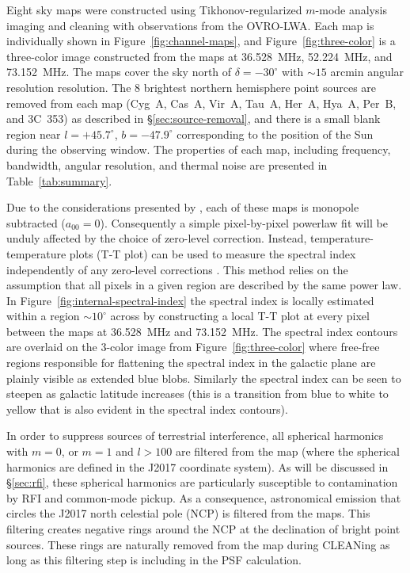 \documentclass[twocolumn]{aastex61}
\begin{document}
Eight sky maps were constructed using Tikhonov-regularized $m$-mode analysis imaging and cleaning
with observations from the OVRO-LWA. Each map is individually shown in
Figure~\ref{fig:channel-maps}, and Figure~\ref{fig:three-color} is a three-color image constructed
from the maps at 36.528~MHz, 52.224~MHz, and 73.152~MHz. The maps cover the sky north of
$\delta=-30^\circ$ with $\sim 15$ arcmin angular resolution resolution. The 8 brightest northern
hemisphere point sources are removed from each map (Cyg~A, Cas~A, Vir~A, Tau~A, Her~A, Hya~A, Per~B,
and 3C~353) as described in \S\ref{sec:source-removal}, and there is a small blank region near
$l=+45.7^\circ$, $b=-47.9^\circ$ corresponding to the position of the Sun during the observing
window. The properties of each map, including frequency, bandwidth, angular resolution, and thermal
noise are presented in Table~\ref{tab:summary}.

Due to the considerations presented by \citet{2016ApJ...826..116V}, each of these maps is monopole
subtracted ($a_{00}=0$). Consequently a simple pixel-by-pixel powerlaw fit will be unduly affected
by the choice of zero-level correction. Instead, temperature-temperature plots (T-T plot) can be
used to measure the spectral index independently of any zero-level corrections
\citep{1962MNRAS.124..297T}. This method relies on the assumption that all pixels in a given region
are described by the same power law. In Figure~\ref{fig:internal-spectral-index} the spectral index
is locally estimated within a region $\sim10^\circ$ across by constructing a local T-T plot at every
pixel between the maps at 36.528~MHz and 73.152~MHz. The spectral index contours are overlaid on the
3-color image from Figure~\ref{fig:three-color} where free-free regions responsible for flattening
the spectral index in the galactic plane are plainly visible as extended blue blobs.  Similarly the
spectral index can be seen to steepen as galactic latitude increases (this is a transition from blue
to white to yellow that is also evident in the spectral index contours).

In order to suppress sources of terrestrial interference, all spherical harmonics with $m=0$, or
$m=1$ and $l>100$ are filtered from the map (where the spherical harmonics are defined in the J2017
coordinate system). As will be discussed in \S\ref{sec:rfi}, these spherical harmonics are
particularly susceptible to contamination by RFI and common-mode pickup. As a consequence,
astronomical emission that circles the J2017 north celestial pole (NCP) is filtered from the maps.
This filtering creates negative rings around the NCP at the declination of bright point sources.
These rings are naturally removed from the map during CLEANing as long as this filtering step is
including in the PSF calculation.
\end{document}
